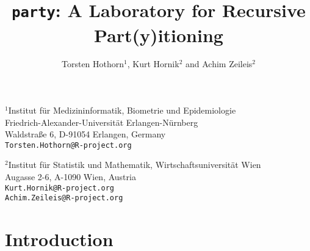 \documentclass[letter]{article}
\begin{document}
\title{\texttt{party}: A Laboratory for Recursive Part(y)itioning}
\author{Torsten Hothorn$^1$, Kurt Hornik$^2$ and Achim Zeileis$^2$}
\date{}
\maketitle

\noindent$^1$Institut f\"ur Medizininformatik, Biometrie und Epidemiologie\\
     Friedrich-Alexander-Universit\"at Erlangen-N\"urnberg\\
     Waldstra{\ss}e 6, D-91054 Erlangen, Germany \\
     \texttt{Torsten.Hothorn@R-project.org}
\newline

\noindent$^2$Institut f\"ur Statistik und Mathematik,
             Wirtschaftsuniversit\"at Wien \\
       Augasse 2-6, A-1090 Wien, Austria \\
       \texttt{Kurt.Hornik@R-project.org} \\
       \texttt{Achim.Zeileis@R-project.org} 
\newline






\section{Introduction}
\end{document}
